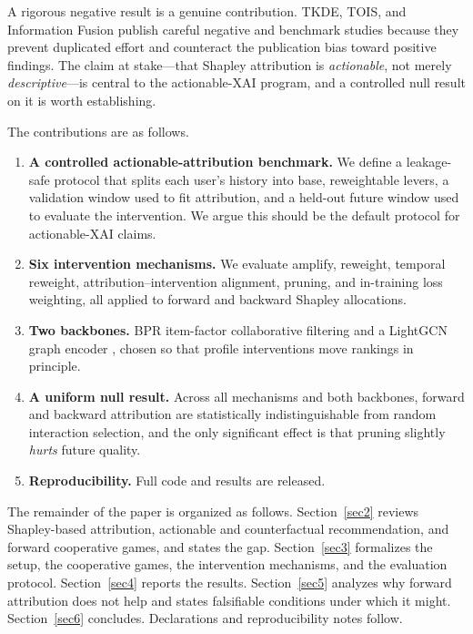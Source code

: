 \documentclass[pdflatex,sn-mathphys-num]{sn-jnl}%
\theoremstyle{thmstyleone}%
\theoremstyle{thmstyletwo}%
\theoremstyle{thmstylethree}%
\begin{document}
A rigorous negative result is a genuine contribution. TKDE, TOIS, and Information Fusion publish careful negative and benchmark studies because they prevent duplicated effort and counteract the publication bias toward positive findings. The claim at stake---that Shapley attribution is \emph{actionable}, not merely \emph{descriptive}---is central to the actionable-XAI program, and a controlled null result on it is worth establishing.

The contributions are as follows.
\begin{enumerate}
\item \textbf{A controlled actionable-attribution benchmark.} We define a leakage-safe protocol that splits each user's history into base, reweightable levers, a validation window used to fit attribution, and a held-out future window used to evaluate the intervention. We argue this should be the default protocol for actionable-XAI claims.
\item \textbf{Six intervention mechanisms.} We evaluate amplify, reweight, temporal reweight, attribution--intervention alignment, pruning, and in-training loss weighting, all applied to forward and backward Shapley allocations.
\item \textbf{Two backbones.} BPR item-factor collaborative filtering \cite{rendle2009bpr} and a LightGCN graph encoder \cite{he2020lightgcn}, chosen so that profile interventions move rankings in principle.
\item \textbf{A uniform null result.} Across all mechanisms and both backbones, forward and backward attribution are statistically indistinguishable from random interaction selection, and the only significant effect is that pruning slightly \emph{hurts} future quality.
\item \textbf{Reproducibility.} Full code and results are released.
\end{enumerate}

The remainder of the paper is organized as follows. Section~\ref{sec2} reviews Shapley-based attribution, actionable and counterfactual recommendation, and forward cooperative games, and states the gap. Section~\ref{sec3} formalizes the setup, the cooperative games, the intervention mechanisms, and the evaluation protocol. Section~\ref{sec4} reports the results. Section~\ref{sec5} analyzes why forward attribution does not help and states falsifiable conditions under which it might. Section~\ref{sec6} concludes. Declarations and reproducibility notes follow.

\end{document}

